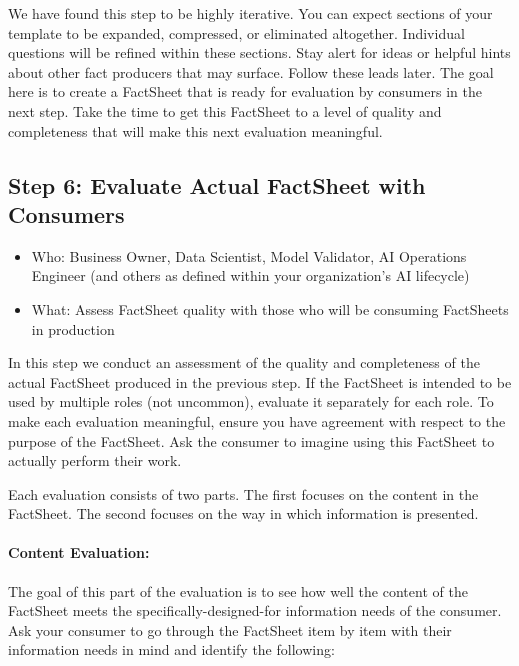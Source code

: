 \documentclass[11pt,dvipdfm]{article}
\begin{document}
We have found this step to be highly iterative. You can expect sections of your template to be expanded, compressed, or eliminated altogether. Individual questions will be refined within these sections. Stay alert for ideas or helpful hints about other fact producers that may surface. Follow these leads later. The goal here is to create a FactSheet that is ready for evaluation by consumers in the next step. Take the time to get this FactSheet to a level of quality and completeness that will make this next evaluation meaningful.

\subsection{Step 6: Evaluate Actual FactSheet with Consumers}

\begin{itemize}[noitemsep,nolistsep]
    \item Who: Business Owner, Data Scientist, Model Validator, AI Operations Engineer (and others as defined within your organization's AI lifecycle)
    \item What: Assess FactSheet quality with those who will be consuming FactSheets in production
\end{itemize}
\hspace{.2cm}

In this step we conduct an assessment of the quality and completeness of the actual FactSheet produced in the previous step. If the FactSheet is intended to be used by multiple roles (not uncommon), evaluate it separately for each role. To make each evaluation meaningful, ensure you have agreement with respect to the purpose of the FactSheet. Ask the consumer to imagine using this FactSheet to actually perform their work.

Each evaluation consists of two parts. The first focuses on the content in the FactSheet. The second focuses on the way in which information is presented.

\paragraph{Content Evaluation:} The goal of this part of the evaluation is to see how well the content of the FactSheet meets the specifically-designed-for information needs of the consumer. Ask your consumer to go through the FactSheet item by item with their information needs in mind and identify the following:\\
\end{document}
